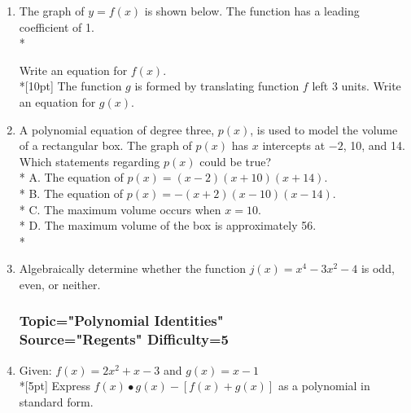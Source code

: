 \documentclass[12pt, oneside]{article}
\begin{document}
\begin{enumerate}
\item The graph of $y = f(x)$ is shown below. The function has a leading coefficient of 1.\\*
\begin{center}
\end{center}
Write an equation for $f(x)$.\\*[10pt]
The function $g$ is formed by translating function $f$ left 3 units. Write an equation for $g(x)$.


\item A polynomial equation of degree three, $p(x)$, is used to model the volume of a rectangular box. The graph of $p(x)$ has $x$ intercepts at  $-2$, 10, and 14. Which statements regarding $p(x)$ could be true?\\*
A. The equation of $p(x) = (x - 2)(x + 10)(x +14)$.\\*
B. The equation of $p(x) = -(x + 2)(x - 10)(x - 14)$.\\*
C. The maximum volume occurs when $x = 10$.\\*
D. The maximum volume of the box is approximately 56.\\* %

\item Algebraically determine whether the function $j(x) = x^4- 3x^2- 4$ is odd, even, or neither. %

\subsubsection*{Topic="Polynomial Identities"\\
Source="Regents" 
Difficulty=5}

\item Given: $f(x)=2x^2+ x - 3$ and $g(x)=x-1$\\*[5pt]
Express $f(x) \bullet g(x) - [f(x) + g(x)]$ as a polynomial in standard form. %


\end{enumerate}
\end{document}

